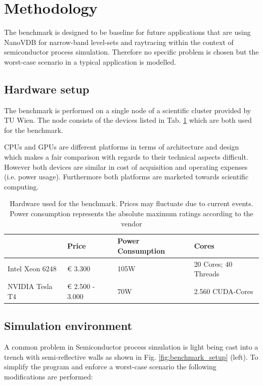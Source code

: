 \section{Methodology}
\label{sec:methodology}

The benchmark is designed to be baseline for future applications that are using NanoVDB for narrow-band level-sets and raytracing within the context of semiconductor process simulation.
Therefore no specific problem is chosen but the worst-case scenario in a typical application is modelled.

\subsection{Hardware setup}
The benchmark is performed on a single node of a scientific cluster provided by TU Wien.
The node consists of the devices listed in Tab. \ref{tab:hardware} which are both used for the benchmark.

CPUs and GPUs are different platforms in terms of architecture and design which makes a fair comparison with regards to their technical aspects difficult.
However both devices are similar in cost of acquisition and operating expenses (i.e. power usage).
Furthermore both platforms are marketed towards scientific computing.


\begin{table}[H]
	\caption{Hardware used for the benchmark. Prices may fluctuate due to current events. Power consumption represents the absolute maximum ratings according to the vendor}
	\centering
	\begin{tabular}{@{}llll@{}}
		\toprule
		                & Price           & Power Consumption & Cores                \\ \hline
		Intel Xeon 6248 & € 3.300         & 105W              & 20 Cores; 40 Threads \\
		NVIDIA Tesla T4 & € 2.500 - 3.000 & 70W               & 2.560 CUDA-Cores     \\ \bottomrule
	\end{tabular}
	\label{tab:hardware}
\end{table}


\subsection{Simulation environment}

A common problem in Semiconductor process simulation is light being cast into a trench with semi-reflective walls as shown in Fig. \ref{fig:benchmark_setup} (left).
To simplify the program and enforce a worst-case scenario the following modifications are performed:


